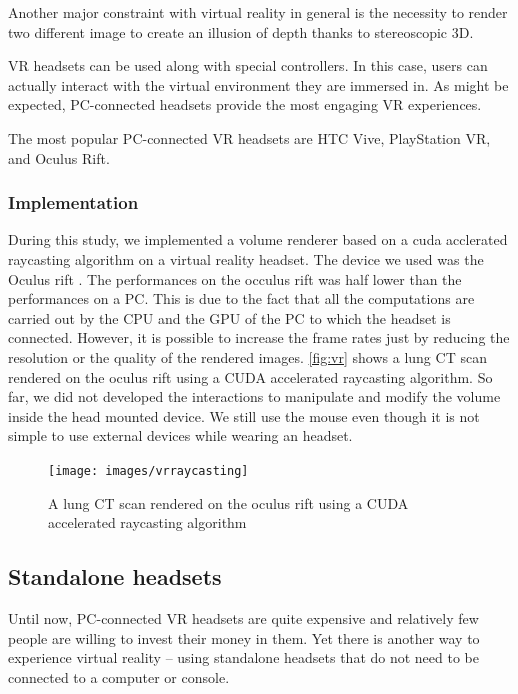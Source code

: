Another major constraint with virtual reality in general is the necessity to render two different image to create an illusion of depth thanks to stereoscopic 3D.


VR headsets can be used along with special controllers. In this case, users can actually interact with the virtual environment they are immersed in. As might be expected, PC-connected headsets provide the most engaging VR experiences.

The most popular PC-connected VR headsets are HTC Vive, PlayStation VR, and Oculus Rift.

\subsubsection{Implementation}

During this study, we implemented a volume renderer based on a cuda acclerated raycasting algorithm on a virtual reality headset. The device we used was the Oculus rift \cite{oculus}. The performances on the occulus rift was half lower than the performances on a PC. This is due to the fact that all the computations are carried out by the CPU and the GPU of the PC to which the headset is connected.  However, it is possible to increase the frame rates just by reducing the resolution or the quality of the rendered images. \autoref{fig:vr} shows a lung  CT scan rendered on the oculus rift using a CUDA accelerated raycasting algorithm. So far, we did not developed the interactions to manipulate and modify the volume inside the head mounted device. We still use the mouse even though it is not simple to use external devices while wearing an headset.


\begin{figure}
\centering
\texttt{[image: images/vrraycasting]}
\caption{A lung CT scan rendered on the oculus rift using a CUDA accelerated raycasting algorithm }
\label{fig:vr}
\end{figure}



\subsection{Standalone headsets}

Until now, PC-connected VR headsets are quite expensive and relatively few people are willing to invest their money in them. Yet there is another way to experience virtual reality – using standalone headsets that do not need to be connected to a computer or console.

